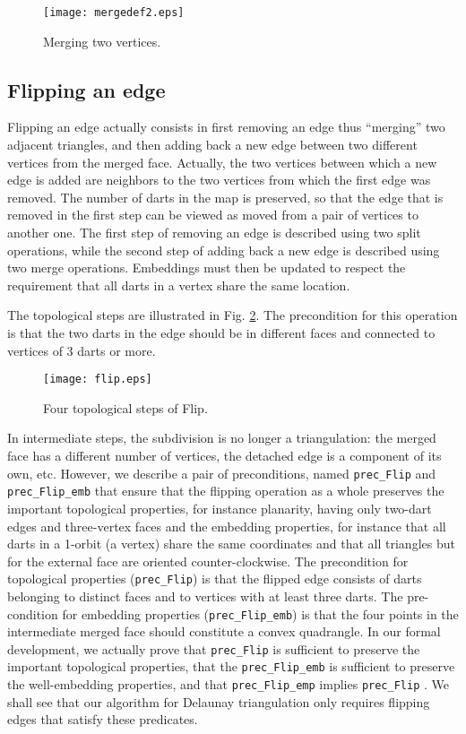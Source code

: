 \documentclass{llncs}
\begin{document}
\begin{figure}
\begin{center}
\texttt{[image: mergedef2.eps]}
\end{center}
\caption{Merging two vertices.}
\label{fig:mergedef2}
\end{figure}

\subsection{Flipping an edge}
\label{Flipedge}

Flipping an edge actually consists in first removing an edge thus
``merging'' two adjacent triangles, and then adding back a new edge
between two different vertices from the merged face.  Actually, the
two vertices between which a new edge is added are neighbors to the
two vertices from which the first edge was removed.  The number
of darts in the map is preserved, so that the edge that is removed in
the first step can be viewed as moved from a pair of vertices to
another one.  The first step of removing an edge is described using two
split operations, while the second step of adding back a new edge is
described using two merge operations.  Embeddings must then be updated
to respect the requirement that all darts in a vertex share the same
location.

The topological steps are illustrated in Fig. \ref{fig:flip}.  
The precondition for this operation is that the two darts in the edge should
be in different faces and connected to vertices of 3 darts or more.

\begin{figure}
\begin{center}
\texttt{[image: flip.eps]}
\end{center}
\caption{Four topological steps of Flip.}
\label{fig:flip}
\end{figure}
In intermediate steps, the subdivision is no longer a
triangulation: the merged face has a different number of vertices, the
detached edge is a component of its own, etc.  However, we describe a pair
of preconditions, named {\tt prec\_Flip} and {\tt prec\_Flip\_emb}
that ensure that the flipping operation as a whole preserves the important
topological properties, for instance planarity, having only two-dart edges and
three-vertex faces and the embedding properties, for instance that all
darts in a 1-orbit (a vertex) share the same coordinates and that
all triangles but for the external face are oriented counter-clockwise.
The precondition for topological properties ({\tt prec\_Flip})
is that the flipped edge consists
of darts belonging to distinct faces and to vertices with at least three 
darts. The pre-condition for embedding properties ({\tt prec\_Flip\_emb})
is that the four
points in the intermediate merged face should constitute a convex quadrangle.
In our formal development, we actually prove that {\tt prec\_Flip} is
sufficient to preserve the important topological properties, that the
{\tt prec\_Flip\_emb} is sufficient to preserve the well-embedding properties,
and that {\tt prec\_Flip\_emp} implies {\tt prec\_Flip} \cite{duf09b}.
We shall see that our algorithm for Delaunay triangulation only requires
flipping edges that satisfy these predicates.
\end{document}
